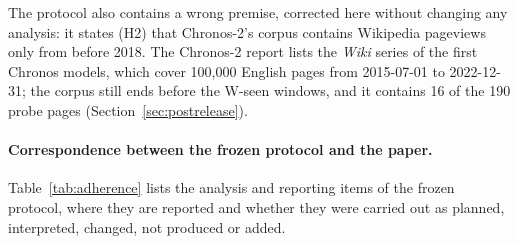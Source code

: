 The protocol also contains a wrong premise, corrected here without changing any analysis: it states (H2) that Chronos-2's corpus
contains Wikipedia pageviews only from before 2018. The Chronos-2 report lists the \emph{Wiki} series of the first Chronos models,
which cover 100{,}000 English pages from 2015-07-01 to 2022-12-31; the corpus still ends before the W-seen windows, and it contains
16 of the 190 probe pages (Section~\ref{sec:postrelease}).

\paragraph{Correspondence between the frozen protocol and the paper.} Table~\ref{tab:adherence} lists the analysis and reporting items
of the frozen protocol, where they are reported and whether they were carried out as planned, interpreted, changed, not produced or
added.

